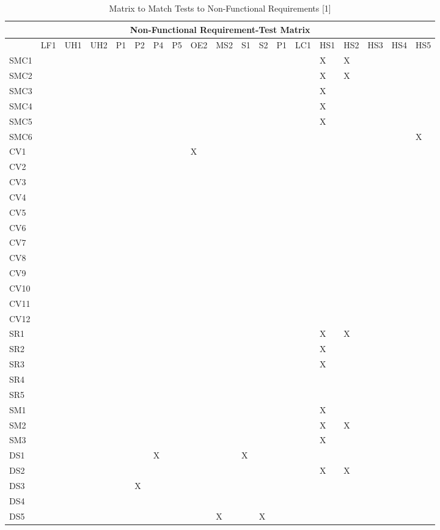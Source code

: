 \documentclass[11pt]{article}
\begin{document}
\begin{table}[H]
\centering
\caption{Matrix to Match Tests to Non-Functional Requirements [1]}
\label{label3}
\begin{tabular}{| l | l | l | l | l | l | l | l | l | l | l | l | l | l | l | l | l | l | l |}
\hline
\multicolumn{19}{|c|}{\textbf{Non-Functional Requirement-Test Matrix}}                          \\ \hline
 & \tiny{LF1} & \tiny{UH1} & \tiny{UH2} & \tiny{P1} & \tiny{P2} & \tiny{P4} & \tiny{P5} & \tiny{OE2} & \tiny{MS2} & \tiny{S1} & \tiny{S2} & \tiny{P1} & \tiny{LC1} & \tiny{HS1} & \tiny{HS2} & \tiny{HS3} & \tiny{HS4} & \tiny{HS5} \\ \hline
SMC1&&&&&&&&&&&&&&X&X&&& \\ \hline
SMC2&&&&&&&&&&&&&&X&X&&& \\ \hline
SMC3&&&&&&&&&&&&&&X&&&& \\ \hline
SMC4&&&&&&&&&&&&&&X&&&& \\ \hline
SMC5&&&&&&&&&&&&&&X&&&& \\ \hline
SMC6&&&&&&&&&&&&&&&&&&X \\ \hline
CV1&&&&&&&&X&&&&&&&&&& \\ \hline
CV2&&&&&&&&&&&&&&&&&& \\ \hline
CV3&&&&&&&&&&&&&&&&&& \\ \hline
CV4&&&&&&&&&&&&&&&&&& \\ \hline
CV5&&&&&&&&&&&&&&&&&& \\ \hline
CV6&&&&&&&&&&&&&&&&&& \\ \hline
CV7&&&&&&&&&&&&&&&&&& \\ \hline
CV8&&&&&&&&&&&&&&&&&& \\ \hline
CV9&&&&&&&&&&&&&&&&&& \\ \hline
CV10&&&&&&&&&&&&&&&&&& \\ \hline
CV11&&&&&&&&&&&&&&&&&& \\ \hline
CV12&&&&&&&&&&&&&&&&&& \\ \hline
SR1&&&&&&&&&&&&&&X&X&&& \\ \hline
SR2&&&&&&&&&&&&&&X&&&& \\ \hline
SR3&&&&&&&&&&&&&&X&&&& \\ \hline
SR4&&&&&&&&&&&&&&&&&& \\ \hline
SR5&&&&&&&&&&&&&&&&&& \\ \hline
SM1&&&&&&&&&&&&&&X&&&& \\ \hline
SM2&&&&&&&&&&&&&&X&X&&& \\ \hline
SM3&&&&&&&&&&&&&&X&&&& \\ \hline
DS1&&&&&&X&&&&X&&&&&&&& \\ \hline
DS2&&&&&&&&&&&&&&X&X&&& \\ \hline
DS3&&&&&X&&&&&&&&&&&&& \\ \hline
DS4&&&&&&&&&&&&&&&&&& \\ \hline
DS5&&&&&&&&&X&&X&&&&&&& \\ \hline
\end{tabular}
\end{table}
\end{document}
